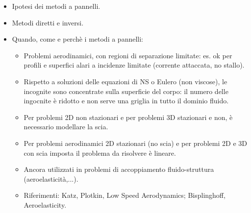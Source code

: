 \begin{itemize}

 \item Ipotesi dei metodi a pannelli.

 \item Metodi diretti e inversi.

 \item Quando, come e perchè i metodi a pannelli:
  
  \begin{itemize}
    
   \item Problemi aerodinamici, con regioni di separazione limitate: 
   es. ok per profili e superfici alari a incidenze limitate (corrente attaccata, no stallo).
   
   \item Rispetto a soluzioni delle equazioni di NS o Eulero (non viscose), le incognite sono 
   concentrate sulla superficie del corpo: il numero delle ingocnite è ridotto e non serve una
   griglia in tutto il dominio fluido. 
   
   \item Per problemi 2D non stazionari e per problemi 3D stazionari e non, è necessario 
   modellare la scia.
   
   \item Per problemi aerodinamici 2D stazionari (no scia) e per problemi 2D e 3D con scia imposta
   il problema da risolvere è lineare.
      
   \item Ancora utilizzati in problemi di accoppiamento fluido-struttura (aeroelasticità,...).
   
   \item Riferimenti: Katz, Plotkin, Low Speed Aerodynamics; Bisplinghoff, Aeroelasticity.
  
  \end{itemize}

\end{itemize}
